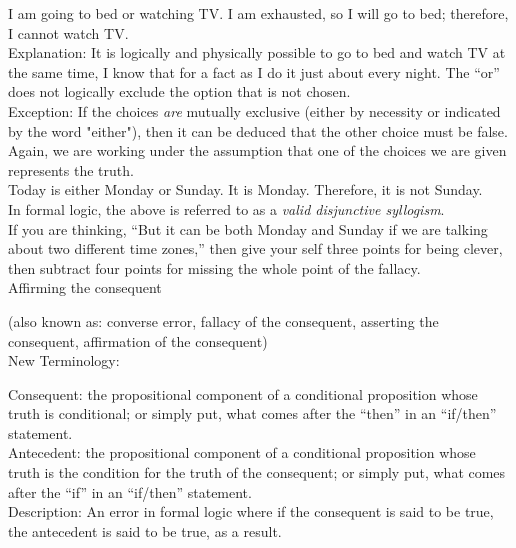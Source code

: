 \documentclass[a4paper,12pt,single,pdftex]{scrbook}
\begin{document}
    
      I am going to bed or watching TV.  I am exhausted, so I will go to bed; therefore, I cannot watch TV.
    \\

    
      Explanation: It is logically and physically possible to go to bed and watch TV at the same time, I know that for a fact as I do it just about every night.  The “or” does not logically exclude the option that is not chosen.
    \\

    
      Exception: If the choices {\it are} mutually exclusive (either by necessity or indicated by the word "either"), then it can be deduced that the other choice must be false.  Again, we are working under the assumption that one of the choices we are given represents the truth.
    \\

    
      Today is either Monday or Sunday.  It is Monday.  Therefore, it is not Sunday.
    \\

    
      In formal logic, the above is referred to as a {\it valid disjunctive syllogism}.
    \\

    
      If you are thinking, “But it can be both Monday and Sunday if we are talking about two different time zones,” then give your self three points for being clever, then subtract four points for missing the whole point of the fallacy.
    \\

  

Affirming the consequent
    
      (also known as: converse error, fallacy of the consequent, asserting the consequent, affirmation of the consequent)
    \\

  
    New Terminology:

    
      Consequent: the propositional component of a conditional proposition whose truth is conditional; or simply put, what comes after the “then” in an “if/then” statement.
    \\

    
      Antecedent: the propositional component of a conditional proposition whose truth is the condition for the truth of the consequent; or simply put, what comes after the “if” in an “if/then” statement.
    \\

    
      Description: An error in formal logic where if the consequent is said to be true, the antecedent is said to be true, as a result.
    \\
\end{document}
